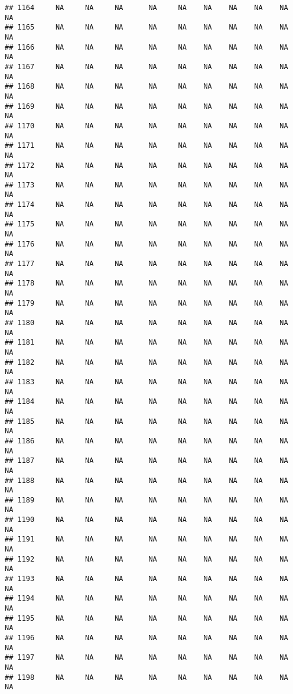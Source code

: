 \documentclass{article}\usepackage{graphicx, color}
\makeatletter
\newenvironment{kframe}{%
 \def\at@end@of@kframe{}%
 \ifinner\ifhmode%
  \def\at@end@of@kframe{\end{minipage}}%
  \begin{minipage}{\columnwidth}%
 \fi\fi%
 \def\FrameCommand##1{\hskip\@totalleftmargin \hskip-\fboxsep
 \colorbox{shadecolor}{##1}\hskip-\fboxsep
     \hskip-\linewidth \hskip-\@totalleftmargin \hskip\columnwidth}%
 \MakeFramed {\advance\hsize-\width
   \@totalleftmargin\z@ \linewidth\hsize
   \@setminipage}}%
 {\par\unskip\endMakeFramed%
 \at@end@of@kframe}
\newenvironment{knitrout}{}{} %
\makeatother
\begin{document}
\begin{knitrout}
\begin{kframe}
\begin{verbatim}
## 1164     NA     NA     NA      NA     NA    NA    NA    NA    NA     NA
## 1165     NA     NA     NA      NA     NA    NA    NA    NA    NA     NA
## 1166     NA     NA     NA      NA     NA    NA    NA    NA    NA     NA
## 1167     NA     NA     NA      NA     NA    NA    NA    NA    NA     NA
## 1168     NA     NA     NA      NA     NA    NA    NA    NA    NA     NA
## 1169     NA     NA     NA      NA     NA    NA    NA    NA    NA     NA
## 1170     NA     NA     NA      NA     NA    NA    NA    NA    NA     NA
## 1171     NA     NA     NA      NA     NA    NA    NA    NA    NA     NA
## 1172     NA     NA     NA      NA     NA    NA    NA    NA    NA     NA
## 1173     NA     NA     NA      NA     NA    NA    NA    NA    NA     NA
## 1174     NA     NA     NA      NA     NA    NA    NA    NA    NA     NA
## 1175     NA     NA     NA      NA     NA    NA    NA    NA    NA     NA
## 1176     NA     NA     NA      NA     NA    NA    NA    NA    NA     NA
## 1177     NA     NA     NA      NA     NA    NA    NA    NA    NA     NA
## 1178     NA     NA     NA      NA     NA    NA    NA    NA    NA     NA
## 1179     NA     NA     NA      NA     NA    NA    NA    NA    NA     NA
## 1180     NA     NA     NA      NA     NA    NA    NA    NA    NA     NA
## 1181     NA     NA     NA      NA     NA    NA    NA    NA    NA     NA
## 1182     NA     NA     NA      NA     NA    NA    NA    NA    NA     NA
## 1183     NA     NA     NA      NA     NA    NA    NA    NA    NA     NA
## 1184     NA     NA     NA      NA     NA    NA    NA    NA    NA     NA
## 1185     NA     NA     NA      NA     NA    NA    NA    NA    NA     NA
## 1186     NA     NA     NA      NA     NA    NA    NA    NA    NA     NA
## 1187     NA     NA     NA      NA     NA    NA    NA    NA    NA     NA
## 1188     NA     NA     NA      NA     NA    NA    NA    NA    NA     NA
## 1189     NA     NA     NA      NA     NA    NA    NA    NA    NA     NA
## 1190     NA     NA     NA      NA     NA    NA    NA    NA    NA     NA
## 1191     NA     NA     NA      NA     NA    NA    NA    NA    NA     NA
## 1192     NA     NA     NA      NA     NA    NA    NA    NA    NA     NA
## 1193     NA     NA     NA      NA     NA    NA    NA    NA    NA     NA
## 1194     NA     NA     NA      NA     NA    NA    NA    NA    NA     NA
## 1195     NA     NA     NA      NA     NA    NA    NA    NA    NA     NA
## 1196     NA     NA     NA      NA     NA    NA    NA    NA    NA     NA
## 1197     NA     NA     NA      NA     NA    NA    NA    NA    NA     NA
## 1198     NA     NA     NA      NA     NA    NA    NA    NA    NA     NA

\end{verbatim}
\end{kframe}
\end{knitrout}
\end{document}
